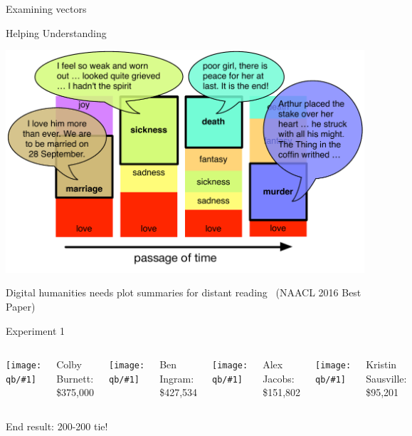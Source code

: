 \documentclass[compress]{beamer}
\newcommand{\gfxq}[2]{
\begin{center}
	\texttt{[image: qb/\#1]}
\end{center}
}
\newif\ifjobtalk\jobtalktrue
\begin{document}
\begin{frame}{Examining vectors}

  \only<1>{\gfxq{mann}{.65}}

\end{frame}

\begin{frame}{Helping Understanding}


  \begin{center}
    \includegraphics[width=.8\linewidth]{qb/lucy_and_arthur}
  \end{center}

  Digital humanities needs plot summaries for distant
  reading~\cite{iyyer-16} \ifjobtalk (NAACL 2016 Best Paper) \fi

\end{frame}

\begin{frame}{Experiment 1}

		\begin{columns}
				\gfxq{colby_jeo}{1.0}
                                Colby Burnett:
                                \$375,000
				\gfxq{ben_jeo}{1.0}
                                Ben Ingram:
                                \$427,534
				\gfxq{alex_jeo}{1.0}
                                Alex Jacobs: \$151,802
				\gfxq{kristin_jeo}{1.0}
                                Kristin Sausville: \$95,201
		\end{columns}

                \pause


                \begin{center}
                End result: 200-200 tie!
                \end{center}

\end{frame}
\end{document}
